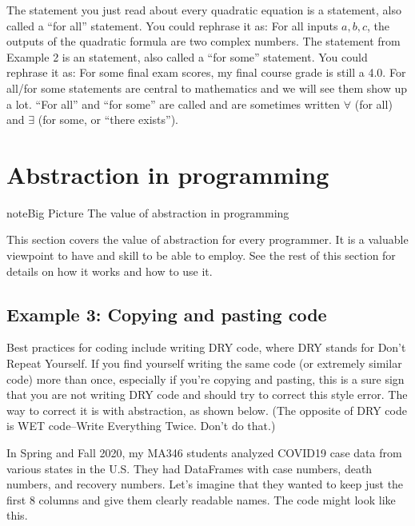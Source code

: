 \documentclass[letterpaper,10pt,english]{jupyterBook}
\begin{document}
\sphinxAtStartPar
The statement you just read about every quadratic equation is a  statement, also called a “for all” statement.  You could rephrase it as:  For all inputs \(a,b,c\), the outputs of the quadratic formula are two complex numbers.  The statement from Example 2 is an  statement, also called a “for some” statement.  You could rephrase it as:  For some final exam scores, my final course grade is still a 4.0.  For all/for some statements are central to mathematics and we will see them show up a lot.  “For all” and “for some” are called  and are sometimes written \(\forall\) (for all) and \(\exists\) (for some, or “there exists”).


\section{Abstraction in programming}
\label{\detokenize{chapter-7-abstraction:abstraction-in-programming}}
\begin{sphinxadmonition}{note}{Big Picture \sphinxhyphen{} The value of abstraction in programming}

\sphinxAtStartPar
This section covers the value of abstraction for every programmer.  It is a valuable viewpoint to have and skill to be able to employ.  See the rest of this section for details on how it works and how to use it.
\end{sphinxadmonition}


\subsection{Example 3: Copying and pasting code}
\label{\detokenize{chapter-7-abstraction:example-3-copying-and-pasting-code}}
\sphinxAtStartPar
Best practices for coding include writing DRY code, where DRY stands for Don’t Repeat Yourself.  If you find yourself writing the same code (or extremely similar code) more than once, especially if you’re copying and pasting, this is a sure sign that you are not writing DRY code and should try to correct this style error.  The way to correct it is with abstraction, as shown below.  (The opposite of DRY code is WET code–Write Everything Twice.  Don’t do that.)

\sphinxAtStartPar
In Spring and Fall 2020, my MA346 students analyzed COVID\sphinxhyphen{}19 case data from various states in the U.S.  They had DataFrames with case numbers, death numbers, and recovery numbers.  Let’s imagine that they wanted to keep just the first 8 columns and give them clearly readable names.  The code might look like this.
\end{document}
